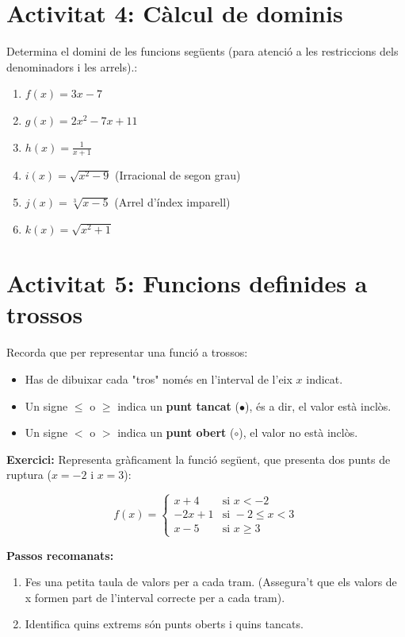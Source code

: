 \documentclass[12pt,a4paper]{article}
\begin{document}
\vspace{0.4cm}

\section*{Activitat 4: Càlcul de dominis}

Determina el domini de les funcions següents (para atenció a les restriccions dels denominadors i les arrels).:

\begin{enumerate}[label=\alph*]
    \item $f(x) = 3x - 7$
    \item $g(x) = 2x^2 - 7x + 11$
    \item $h(x) = \frac{1}{x + 1}$
    \item $i(x) = \sqrt{x^2 - 9}$ \quad (Irracional de segon grau)
    \item $j(x) = \sqrt[3]{x - 5}$ \quad (Arrel d'índex imparell)
    \item $k(x) = \sqrt{x^2 + 1}$ 
\end{enumerate}

\section*{Activitat 5: Funcions definides a trossos}

Recorda que per representar una funció a trossos:
\begin{itemize}
    \item Has de dibuixar cada "tros" només en l'interval de l'eix $x$ indicat.
    \item Un signe $\leq$ o $\geq$ indica un \textbf{punt tancat} ($\bullet$), és a dir, el valor està inclòs.
    \item Un signe $<$ o $>$ indica un \textbf{punt obert} ($\circ$), el valor no està inclòs.
\end{itemize}

\textbf{Exercici:} Representa gràficament la funció següent, que presenta dos punts de ruptura ($x = -2$ i $x = 3$):

\[
f(x) = \begin{cases} 
x + 4 & \text{si } x < -2 \\
-2x + 1 & \text{si } -2 \leq x < 3 \\
x - 5 & \text{si } x \geq 3 
\end{cases}
\]

\textbf{Passos recomanats:}
\begin{enumerate}
    \item Fes una petita taula de valors per a cada tram. (Assegura't que els valors de x formen part de l'interval correcte per a cada tram).
    \item Identifica quins extrems són punts oberts i quins tancats.
\end{enumerate}

\vspace{0.5cm}
\end{document}
